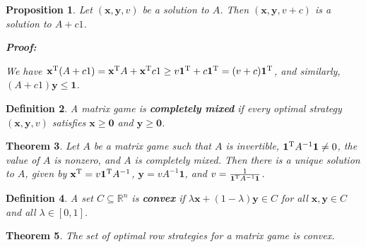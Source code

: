 \documentclass{article}
\theoremstyle{colontheorem}
\newtheorem{theorem}{Theorem}[section]
\newtheorem{proposition}[theorem]{Proposition}
\newtheorem{definition}[theorem]{Definition}
\newcommand{\T}{^\textnormal{T}}
\newenvironment{Theorem}
{
	\begin{mdframed}[backgroundcolor=TheoremOrange!10]
	\begin{theorem}
}
{
	\end{theorem}
	\end{mdframed}
	
	\vspace{.15in}
}
\newenvironment{Proposition}
{
	\begin{mdframed}[backgroundcolor=PropPink!10]
	\begin{proposition}
}
{
	\end{proposition}
	\end{mdframed}
	
	\vspace{.15in}
}
\newenvironment{Def}
{
	\begin{mdframed}[backgroundcolor=DefGreen!10]
	\begin{definition}
}
{
	\end{definition}
	\end{mdframed}
	
	\vspace{.15in}
}
\newenvironment{Proof}
{
	\begin{mdframed}[backgroundcolor=ProofPurple!10]
	\textbf{Proof:}%
}
{
	\end{mdframed}
	
	\vspace{.085in}
}
\begin{document}
\begin{Proposition}
	
	Let $(\mathbf{x}, \mathbf{y}, v)$ be a solution to $A$. Then $(\mathbf{x}, \mathbf{y}, v + c)$ is a solution to $A + c1$.
	
	\begin{Proof}
		We have $\mathbf{x}\T (A + c1) = \mathbf{x}\T A + \mathbf{x}\T c 1 \geq v \mathbf{1}\T + c \mathbf{1}\T = (v + c) \mathbf{1}\T$, and similarly, $(A + c1) \mathbf{y} \leq \mathbf{1}$.
		
	\end{Proof}
	
\end{Proposition}



\begin{Def}
	
	A matrix game is \textbf{completely mixed} if every optimal strategy $(\mathbf{x}, \mathbf{y}, v)$ satisfies $\mathbf{x} \geq \mathbf{0}$ and $\mathbf{y} \geq \mathbf{0}$.
	
\end{Def}



\begin{Theorem}
	
	Let $A$ be a matrix game such that $A$ is invertible, $\mathbf{1}\T A^{-1} \mathbf{1} \neq 0$, the value of $A$ is nonzero, and $A$ is completely mixed. Then there is a unique solution to $A$, given by $\mathbf{x}\T = v \mathbf{1}\T A^{-1}$, $\mathbf{y} = v A^{-1} \mathbf{1}$, and $v = \frac{1}{\mathbf{1}\T A^{-1} \mathbf{1}}$.
	
\end{Theorem}



\begin{Def}
	
	A set $C \subseteq \mathbb{R}^n$ is \textbf{convex} if $\lambda \mathbf{x} + (1 - \lambda) \mathbf{y} \in C$ for all $\mathbf{x}, \mathbf{y} \in C$ and all $\lambda \in [0, 1]$.
	
\end{Def}



\begin{Theorem}
	
	The set of optimal row strategies for a matrix game is convex.
	
\end{Theorem}
\end{document}
